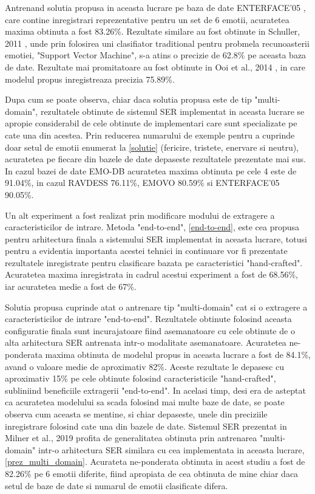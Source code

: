 \documentclass[a4paper,12pt]{book}
\begin{document}
		 Antrenand solutia propusa in aceasta lucrare pe baza de date ENTERFACE'05 \cite{enterface}, care contine inregistrari reprezentative pentru un set de 6 emotii, acuratetea maxima obtinuta a fost 83.26\%. Rezultate similare au fost obtinute in Schuller, 2011 \cite{comp6}, unde prin folosirea uni clasifiator traditional pentru probmela recunoasterii emotiei, "Support Vector Machine", s-a atins o precizie de 62.8\% pe aceasta baza de date. Rezultate mai promitatoare au fost obtinute in Ooi et al., 2014 \cite{comp7}, in care modelul propus inregistreaza precizia 75.89\%. \par
		 
		 Dupa cum se poate observa, chiar daca solutia propusa este de tip "multi-domain", rezultatele obtinute de sistemul SER implementat in aceasta lucrare se apropie considerabil de cele obtinute de implementari care sunt specializate pe cate una din acestea. Prin reducerea numarului de exemple pentru a cuprinde doar setul de emotii enumerat la \ref{solutie} (fericire, tristete, enervare si neutru), acuratetea pe fiecare din bazele de date depaseste rezultatele prezentate mai sus. In cazul bazei de date EMO-DB acuratetea maxima obtinuta pe cele 4 este de 91.04\%, in cazul RAVDESS 76.11\%, EMOVO 80.59\% si ENTERFACE'05 90.05\%.  
		 
		 \par		 
		 Un alt experiment a fost realizat prin modificare modului de extragere a caracteristicilor de intrare. Metoda "end-to-end", \ref{end-to-end}, este cea propusa pentru arhitectura finala a sistemului SER implementat in aceasta lucrare, totusi pentru a evidentia importanta acestei tehnici in continuare vor fi prezentate rezultatele inregistrate pentru clasificare bazata pe caracteristici "hand-crafted". Acuratetea maxima inregistrata in cadrul acestui experiment a fost de 68.56\%, iar acuratetea medie a fost de 67\%.
		 	
		 \par
		 Solutia propusa cuprinde atat o antrenare tip "multi-domain" cat si o extragere a caracteristicilor de intrare "end-to-end". Rezultatele obtinute folosind aceasta configuratie finala sunt incurajatoare fiind asemanatoare cu cele obtinute de o alta arhitectura SER antrenata intr-o modalitate asemanatoare. Acuratetea ne-ponderata maxima obtinuta de modelul propus in aceasta lucrare a fost de 84.1\%, avand o valoare medie de aproximativ 82\%. Aceste rezultate le depasesc cu aproximativ 15\% pe cele obtinute folosind caracteristicile "hand-crafted", subliniind beneficiile extragerii "end-to-end". In acelasi timp, desi era de asteptat ca acuratetea modelului sa scada folosind mai multe baze de date, se poate observa cum aceasta se mentine, si chiar depaseste, unele din preciziile inregistrare folosind cate una din bazele de date. Sistemul SER prezentat in Milner et al., 2019 \cite{multi-domain} profita de generalitatea obtinuta prin antrenarea "multi-domain" intr-o arhitectura SER similara cu cea implementata in aceasta lucrare, \ref{prez_multi_domain}. Acurateta ne-ponderata obtinuta in acest studiu a fost de 82.26\% pe 6 emotii diferite, fiind apropiata de cea obtinuta de mine chiar daca setul de baze de date si numarul de emotii clasificate difera. \par		 
		 
\end{document}
